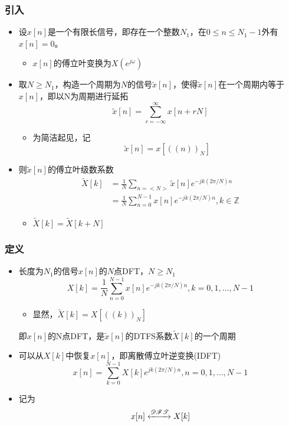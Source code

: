 \documentclass[CJKutf8,dvipsnames,table]{beamer}
\begin{document}
\begin{CJK*}{UTF8}{song}
  \begin{frame}
    \frametitle{引入}
    \begin{itemize}
    \item 设$x[n]$是一个有限长信号，即存在一个整数$N_1$，在$0\leq n \leq N_1 - 1$外有$x[n]=0$。
    	\begin{itemize}
    	\item $x[n]$的傅立叶变换为$X(e^{j\omega})$
    	\end{itemize}
	\item 取$N\geq N_1$，构造一个周期为$N$的信号$\tilde{x}[n]$，使得$\tilde{x}[n]$在一个周期内等于$x[n]$，即以N为周期进行延拓
		\[
			\tilde{x}[n]=\sum_{r=-\infty}^{\infty} x[n+rN]
		\]
		\begin{itemize}
		\item 为简洁起见，记
		\[
			\tilde{x}[n]=x[((n))_N]
		\]
		\end{itemize}
	\item 则$\tilde{x}[n]$的傅立叶级数系数
		\begin{align*}
			\tilde{X}[k] & = \frac{1}{N}\sum_{n=<N>} \tilde{x}[n] e^{-jk(2\pi/N)n} \\
		    	& = \frac{1}{N}\sum_{n=0}^{N-1} x[n] e^{-jk(2\pi/N)n}, k \in \mathbb{Z}
		\end{align*}
		\begin{itemize}
		\item $\tilde{X}[k]=\tilde{X}[k+N]$
		\end{itemize}
    \end{itemize}
  \end{frame} 	

  \begin{frame}
    \frametitle{定义}
    \begin{itemize}
	\item 长度为$N_1$的信号$x[n]$的$N$点DFT，$N \geq N_1$
		\[
			X[k] = \frac{1}{N}\sum_{n=0}^{N-1} x[n] e^{-jk(2\pi/N)n}, k=0, 1, \hdots, N-1
		\]
		\begin{itemize}
		\item 显然，$\tilde{X}[k]=X[((k))_N]$
		\end{itemize}
	{\color{red}即$x[n]$的N点DFT，是$\tilde{x}[n]$的DTFS系数$\tilde{X}[k]$的一个周期}
	\item 可以从$X[k]$中恢复$x[n]$，即离散傅立叶逆变换(IDFT)
		\[
			x[n] = \sum_{k=0}^{N-1} X[k] e^{jk(2\pi/N)n}, n=0, 1, \hdots, N-1
		\]
	\item 记为
		\[
			x[n] \xleftrightarrow{\mathscr{DFT}} X[k]
		\]	
    \end{itemize}
  \end{frame} 	
	

\end{CJK*}
\end{document}
